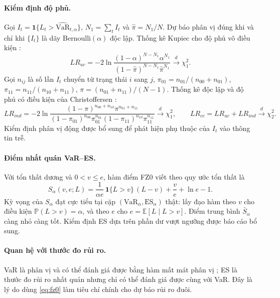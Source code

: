 \documentclass[12pt,a4paper]{article}
\theoremstyle{definition}
\theoremstyle{remark}
\newcommand{\E}{\mathbb{E}}
\newcommand{\Prob}{\mathbb{P}}
\newcommand{\VaR}{\mathrm{VaR}}
\newcommand{\ES}{\mathrm{ES}}
\newcommand{\ind}{\mathbf{1}}
\begin{document}
\paragraph{Kiểm định độ phủ.} Gọi $I_t=\ind\{L_t>\widehat{\VaR}_{t,\alpha}\}$, $N_1=\sum_tI_t$ và $\hat\pi=N_1/N$. Dự báo phân vị đúng khi và chỉ khi $\{I_t\}$ là dãy Bernoulli$(\alpha)$ độc lập. Thống kê Kupiec cho độ phủ vô điều kiện \cite{kupiec1995}:
\begin{equation}
LR_{uc}=-2\ln\frac{(1-\alpha)^{N-N_1}\alpha^{N_1}}{(1-\hat\pi)^{N-N_1}\hat\pi^{N_1}}\xrightarrow{d}\chi^2_1 .
\end{equation}
Gọi $n_{ij}$ là số lần $I_t$ chuyển từ trạng thái $i$ sang $j$, $\pi_{01}=n_{01}/(n_{00}+n_{01})$, $\pi_{11}=n_{11}/(n_{10}+n_{11})$, $\pi=(n_{01}+n_{11})/(N-1)$. Thống kê độc lập và độ phủ có điều kiện của Christoffersen \cite{christoffersen1998}:
\begin{equation}
LR_{ind}=-2\ln\frac{(1-\pi)^{n_{00}+n_{10}}\pi^{n_{01}+n_{11}}}{(1-\pi_{01})^{n_{00}}\pi_{01}^{n_{01}}(1-\pi_{11})^{n_{10}}\pi_{11}^{n_{11}}}\xrightarrow{d}\chi^2_1,\qquad
LR_{cc}=LR_{uc}+LR_{ind}\xrightarrow{d}\chi^2_2 .
\end{equation}
Kiểm định phân vị động \cite{engle_manganelli2004} được bổ sung để phát hiện phụ thuộc của $I_t$ vào thông tin trễ.

\paragraph{Điểm nhất quán VaR--ES.} Với tổn thất dương và $0<v\le e$, hàm điểm FZ0 \cite{fissler2016,pzc2019} viết theo quy ước tổn thất là
\begin{equation}\label{eq:fz0}
S_\alpha(v,e;L)=\frac{1}{\alpha e}\,\ind\{L>v\}\,(L-v)+\frac{v}{e}+\ln e-1 .
\end{equation}
Kỳ vọng của $S_\alpha$ đạt cực tiểu tại cặp $(\VaR_\alpha,\ES_\alpha)$ thật: lấy đạo hàm theo $v$ cho điều kiện $\Prob(L>v)=\alpha$, và theo $e$ cho $e=\E[L\mid L>v]$. Điểm trung bình $\bar S_\alpha$ càng nhỏ càng tốt. Kiểm định ES dựa trên phần dư vượt ngưỡng \cite{mcneilfrey2000} được báo cáo bổ sung.

\paragraph{Quan hệ với thước đo rủi ro.} VaR là phân vị và có thể đánh giá được bằng hàm mất mát phân vị \cite{koenker1978,gneiting2011}; ES là thước đo rủi ro nhất quán \cite{artzner1999,acerbitasche2002} nhưng chỉ có thể đánh giá được cùng với VaR. Đây là lý do dùng \eqref{eq:fz0} làm tiêu chí chính cho dự báo rủi ro đuôi.
\end{document}
